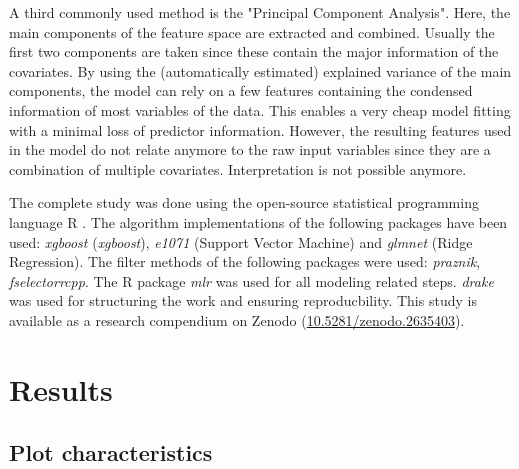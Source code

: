 \documentclass[review]{elsarticle}
\begin{document}
A third commonly used method is the "Principal Component Analysis".
Here, the main components of the feature space are extracted and combined.
Usually the first two components are taken since these contain the major information of the covariates.
By using the (automatically estimated) explained variance of the main components, the model can rely on a few features containing the condensed information of most variables of the data.
This enables a very cheap model fitting with a minimal loss of predictor information.
However, the resulting features used in the model do not relate anymore to the raw input variables since they are a combination of multiple covariates.
Interpretation is not possible anymore.

\noindent The complete study was done using the open-source statistical programming language R \citep{rcoreteam2018}.
The algorithm implementations of the following packages have been used: \textit{xgboost} \citep{chen2016} (\textit{xgboost}), \textit{e1071} \citep{e1071} (Support Vector Machine) and \textit{glmnet} \citep{glmnet} (Ridge Regression).
The filter methods of the following packages were used: \textit{praznik}, \textit{fselectorrcpp}.
The R package \textit{mlr} \citep{mlr} was used for all modeling related steps.
\textit{drake} was used for structuring the work and ensuring reproducbility.
This study is available as a research compendium on Zenodo (\url{10.5281/zenodo.2635403}).


\section{Results}

\subsection{Plot characteristics}


\end{document}
